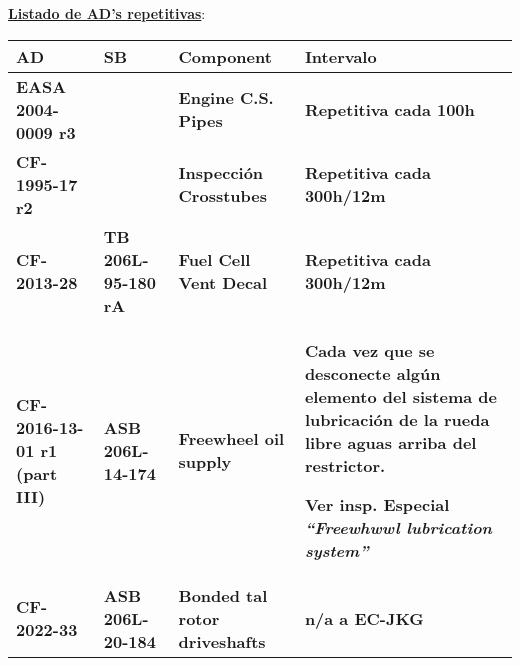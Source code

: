 \documentclass[
]{article}
\begin{document}
\textbf{\ul{Listado de AD's repetitivas}}:

\begin{longtable}[]{@{}|
  >{\raggedright\arraybackslash}p{}|
  >{\raggedright\arraybackslash}p{}|
  >{\raggedright\arraybackslash}p{}|
  >{\raggedright\arraybackslash}p{}|@{}}
\hline
\textbf{AD} & \textbf{SB} & \textbf{Component} & \textbf{Intervalo} \\
\hline
\textbf{EASA 2004-0009 r3} & & \textbf{Engine C.S. Pipes} &
\textbf{Repetitiva cada 100h} \\
\hline
\textbf{CF-1995-17 r2} & & \textbf{Inspección Crosstubes} &
\textbf{Repetitiva cada 300h/12m} \\
\hline
\textbf{CF-2013-28} & \textbf{TB 206L-95-180 rA} & \textbf{Fuel Cell
Vent Decal} & \textbf{Repetitiva cada 300h/12m} \\
\hline
\textbf{CF-2016-13-01 r1 (part III)} & \textbf{ASB 206L-14-174} &
\textbf{Freewheel oil supply} & \textbf{Cada vez que se desconecte algún
elemento del sistema de lubricación de la rueda libre aguas arriba del
restrictor.}

\textbf{Ver insp. Especial \emph{``Freewhwwl lubrication system''}} \\
\hline
\textbf{CF-2022-33} & \textbf{ASB 206L-20-184} & \textbf{Bonded tal
rotor driveshafts} & \textbf{n/a a EC-JKG} \\
\hline
\end{longtable}

\hypertarget{section-7}{%
\section*{}\label{section-7}}
\end{document}
